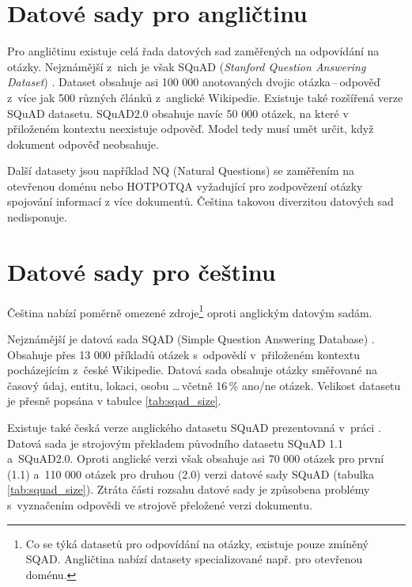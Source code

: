 \section{Datové sady pro angličtinu}
Pro angličtinu existuje celá řada datových sad zaměřených na odpovídání na otázky. Nejznámější z~nich je však SQuAD (\emph{Stanford Question Answering Dataset}) \cite{squad}. Dataset obsahuje asi 100 000 anotovaných dvojic otázka\,--\,odpověď z~více jak 500 různých článků z~anglické Wikipedie. Existuje také rozšířená verze SQuAD datasetu. SQuAD2.0 \cite{squad_v2} obsahuje navíc 50 000 otázek, na které v~ přiloženém kontextu neexistuje odpověď. Model tedy musí umět určit, když dokument odpověď neobsahuje.\par
Další datasety jsou například NQ (Natural Questions) se zaměřením na otevřenou doménu nebo HOTPOTQA vyžadující pro zodpovězení otázky spojování informací z více dokumentů. Čeština takovou diverzitou datových sad nedisponuje.

\section{Datové sady pro češtinu}
Čeština nabízí poměrně omezené zdroje\footnote{Co se týká datasetů pro odpovídání na otázky, existuje pouze zmíněný SQAD. Angličtina nabízí datasety specializované např. pro otevřenou doménu.} oproti anglickým datovým sadám.\par 
Nejznámější je datová sada SQAD (Simple Question Answering Database) \cite{sqad}. Obsahuje přes 13 000 příkladů otázek s~odpovědí v~přiloženém kontextu pocházejícím z~české Wikipedie. Datová sada obsahuje otázky směřované na časový údaj, entitu, lokaci, osobu \dots \,včetně 16\,\% ano/ne otázek. Velikost datasetu je přesně popsána v tabulce \ref{tab:sqad_size}.\par
Existuje také česká verze anglického datasetu SQuAD prezentovaná v~práci \cite{czech_squad}. Datová sada je strojovým překladem původního datasetu SQuAD 1.1 a~SQuAD2.0. Oproti anglické verzi však obsahuje asi 70 000 otázek pro první (1.1) a~110 000 otázek pro druhou (2.0) verzi datové sady SQuAD (tabulka \ref{tab:squad_size}). Ztráta části rozsahu datové sady je způsobena problémy s~vyznačením odpovědi ve strojově přeložené verzi dokumentu.

